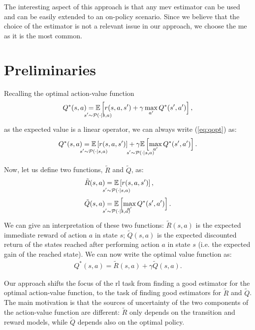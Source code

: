 The interesting aspect of this approach is that any \gls{mev} estimator can be used and can be easily extended to an on-policy scenario. Since we believe that the choice of the estimator is not a relevant issue in our approach, we choose the \gls{me} as it is the most common.

\section{Preliminaries}
Recalling the optimal action-value function
\begin{align}
 Q^*(s,a)=\underset{\strut\mathclap{s'\sim \mathcal{P}(\cdot|s,a)}}{\mathbb{E}}\left[ r(s,a,s')+\gamma\max_{a'} Q^*(s',a')\right],
 \label{eq:qopt}
\end{align}
as the expected value is a linear operator, we can always write (\ref{eq:qopt}) as:
\begin{align}
 Q^*(s,a)=\underset{\strut\mathclap{s'\sim \mathcal{P}(\cdot|s,a)}}{\mathbb{E}}\left[ r(s,a,s')\right]+\underset{\strut\mathclap{s'\sim \mathcal{P}(\cdot|s,a)}}{\gamma\mathbb{E}}\left[ \max_{a'} Q^*(s',a')\right].
 \label{eq:qdec}
\end{align}

Now, let us define two functions, $\tilde{R}$ and $\tilde{Q}$, as:
\begin{align}
 \tilde{R}(s,a)&=\underset{\strut\mathclap{s'\sim \mathcal{P}(\cdot|s,a)}}{\mathbb{E}}\left[ r(s,a,s')\right], \nonumber\ \\
 \tilde{Q}(s,a)&=\underset{\strut\mathclap{s'\sim \mathcal{P}(\cdot|s,a)}}{\mathbb{E}}\left[\max_{a'} Q^*(s',a')\right].
 \label{eq:rqtilde}
\end{align}
We can give an interpretation of these two functions: $\tilde{R}(s,a)$ is the expected immediate reward of action $a$ in state $s$; $\tilde{Q}(s,a)$ is the expected discounted return of the states reached after performing action $a$ in state $s$ (i.e. the expected gain of the reached state).
We can now write the optimal value function as:
\begin{align}
 Q^*(s,a)=\tilde{R}(s,a)+\gamma\tilde{Q}(s,a).
 \label{eq:qdecrqtilde}
\end{align}

Our approach shifts the focus of the \gls{rl} task from finding a good estimator for the optimal action-value function, to the task of finding good estimators for $\tilde{R}$ and $\tilde{Q}$. The main motivation is that the sources of uncertainty of the two components of the action-value function are different: $\tilde{R}$ only depends on the transition and reward models, while $\tilde{Q}$ depends also on the optimal policy.
